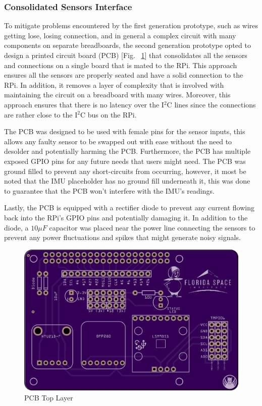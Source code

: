
\subsubsection{Consolidated Sensors Interface}

\indent\indent To mitigate problems encountered by the first generation prototype, such as wires getting lose, losing connection, and in general a complex circuit with many components on separate breadboards, the second generation prototype opted to design a printed circuit board (PCB) [Fig. ~\ref{fig:PCB_top}] that consolidates all the sensors and connections on a single board that is mated to the RPi. This approach ensures all the sensors are properly seated and have a solid connection to the RPi. In addition, it removes a layer of complexity that is involved with maintaining the circuit on a breadboard with many wires. Moreover, this approach ensures that there is no latency over the I$^2$C lines since the connections are rather close to the I$^2$C bus on the RPi.

The PCB was designed to be used with female pins for the sensor inputs, this allows any faulty sensor to be swapped out with ease without the need to desolder and potentially harming the PCB. Furthermore, the PCB has multiple exposed GPIO pins for any future needs that users might need. The PCB was ground filled to prevent any short-circuits from occurring, however, it most be noted that the IMU placeholder has no ground fill underneath it, this was done to guarantee that the PCB won't interfere with the IMU's readings.

Lastly, the PCB is equipped with a rectifier diode to prevent any current flowing back into the RPi's GPIO pins and potentially damaging it. In addition to the diode, a $10\mu F$ capacitor was placed near the power line connecting the sensors to prevent any power fluctuations and spikes that might generate noisy signals.

\begin{figure}[H]
  \centering
  \includegraphics[width=0.75\linewidth]{Controls/PCB_top.png}
  \caption{\label{fig:PCB_top}PCB Top Layer} 
\end{figure}

